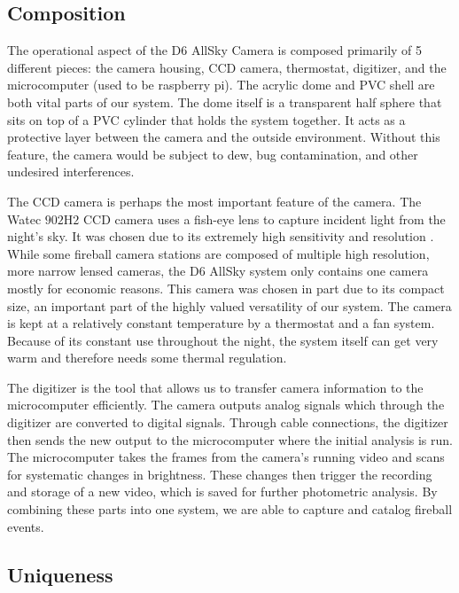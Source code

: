 \subsection{Composition}

The operational aspect of the D6 AllSky Camera is composed primarily of 5 different pieces: the camera housing, CCD camera, thermostat, digitizer, and the microcomputer (used to be raspberry pi).
The acrylic dome and PVC shell are both vital parts of our system. 
The dome itself is a transparent half sphere that sits on top of a PVC cylinder that holds the system together.
It acts as a protective layer between the camera and the outside environment.  
Without this feature, the camera would be subject to dew, bug contamination, and other undesired interferences.

The CCD camera is perhaps the most important feature of the camera.  
The Watec $902$H$2$ CCD camera uses a fish-eye lens to capture incident light from the night's sky.  
It was chosen due to its extremely high sensitivity and resolution \cite{mcswain_using_2016}.
While some fireball camera stations are composed of multiple high resolution, more narrow lensed cameras, the D6 AllSky system only contains one camera mostly for economic reasons.  
This camera was chosen in part due to its compact size, an important part of the highly valued versatility of our system. 
The camera is kept at a relatively constant temperature by a thermostat and a fan system. 
Because of its constant use throughout the night, the system itself can get very warm and therefore needs some thermal regulation.

The digitizer is the tool that allows us to transfer camera information to the microcomputer efficiently.  
The camera outputs analog signals which through the digitizer are converted to digital signals.
Through cable connections, the digitizer then sends the new output to the microcomputer where the initial analysis is run. 
The microcomputer takes the frames from the camera's running video and scans for systematic changes in brightness.
These changes then trigger the recording and storage of a new video, which is saved for further photometric analysis.
By combining these parts into one system, we are able to capture and catalog fireball events.

\subsection{Uniqueness}

